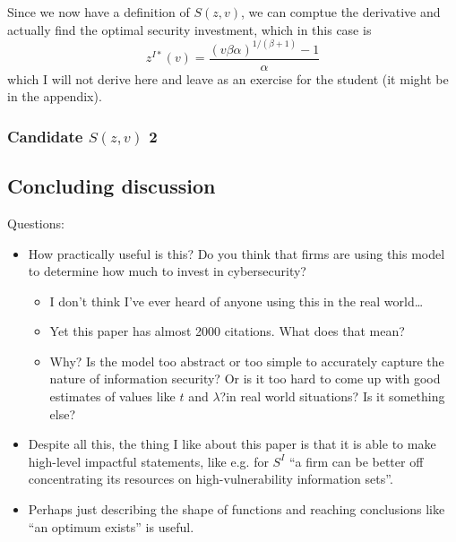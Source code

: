 \documentclass[11pt]{article}
\begin{document}
Since we now have a definition of $S(z,v)$, we can comptue the derivative and actually find the optimal security investment, which in this case is 
$$z^{I*}(v) = \frac{(v \beta \alpha )^{1/(\beta + 1)} - 1}{\alpha}$$ 
which I will not derive here and leave as an exercise for the student (it might be in the appendix).

\subsubsection{Candidate $S(z,v)$ 2}


\subsection{Concluding discussion}

Questions:
\begin{itemize}
    \item How practically useful is this? Do you think that firms are using this model to determine how much to invest in cybersecurity?
    \begin{itemize}
        \item I don't think I've ever heard of anyone using this in the real world\dots
        \item Yet this paper has almost 2000 citations. What does that mean?
        \item Why? Is the model too abstract or too simple to accurately capture the nature of information security? Or is it too hard to come up with good estimates of values like $t$ and $\lambda$?in real world situations? Is it something else?
    \end{itemize}
    \item Despite all this, the thing I like about this paper is that it is able to make high-level impactful statements, like e.g. for $S^I$ ``a firm can be better off concentrating its resources on high-vulnerability information sets''.
    \item Perhaps just describing the shape of functions and reaching conclusions like ``an optimum exists'' is useful. 
\end{itemize}
\end{document}
